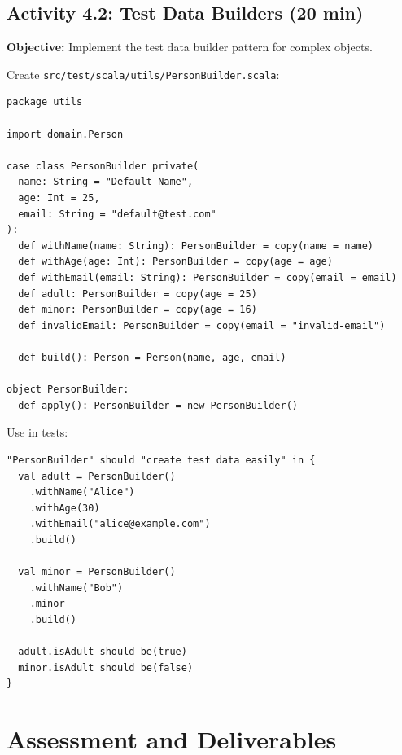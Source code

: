 \documentclass[12pt,a4paper]{article}
\begin{document}
\subsection{Activity 4.2: Test Data Builders (20 min)}

\textbf{Objective:} Implement the test data builder pattern for complex objects.

Create \texttt{src/test/scala/utils/PersonBuilder.scala}:

\begin{lstlisting}
package utils

import domain.Person

case class PersonBuilder private(
  name: String = "Default Name",
  age: Int = 25,
  email: String = "default@test.com"
):
  def withName(name: String): PersonBuilder = copy(name = name)
  def withAge(age: Int): PersonBuilder = copy(age = age)
  def withEmail(email: String): PersonBuilder = copy(email = email)
  def adult: PersonBuilder = copy(age = 25)
  def minor: PersonBuilder = copy(age = 16)
  def invalidEmail: PersonBuilder = copy(email = "invalid-email")
  
  def build(): Person = Person(name, age, email)

object PersonBuilder:
  def apply(): PersonBuilder = new PersonBuilder()
\end{lstlisting}

Use in tests:

\begin{lstlisting}
"PersonBuilder" should "create test data easily" in {
  val adult = PersonBuilder()
    .withName("Alice")
    .withAge(30)
    .withEmail("alice@example.com")
    .build()
  
  val minor = PersonBuilder()
    .withName("Bob")
    .minor
    .build()
  
  adult.isAdult should be(true)
  minor.isAdult should be(false)
}
\end{lstlisting}

\section{Assessment and Deliverables}
\end{document}
